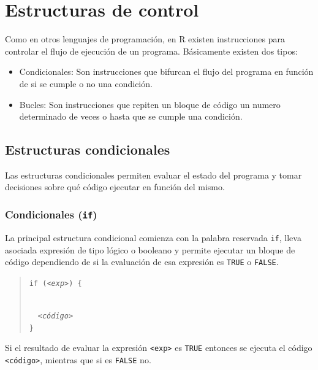\documentclass[
  spanish,
  a4paper,
]{scrreport}
\providecommand{\tightlist}{%
  \setlength{\itemsep}{0pt}\setlength{\parskip}{0pt}}
\theoremstyle{definition}
\theoremstyle{definition}
\theoremstyle{remark}
\begin{document}

\chapter{Estructuras de control}\label{estructuras-de-control}

Como en otros lenguajes de programación, en R existen instrucciones para
controlar el flujo de ejecución de un programa. Básicamente existen dos
tipos:

\begin{itemize}
\tightlist
\item
  Condicionales: Son instrucciones que bifurcan el flujo del programa en
  función de si se cumple o no una condición.
\item
  Bucles: Son instrucciones que repiten un bloque de código un numero
  determinado de veces o hasta que se cumple una condición.
\end{itemize}

\section{Estructuras condicionales}\label{estructuras-condicionales}

Las estructuras condicionales permiten evaluar el estado del programa y
tomar decisiones sobre qué código ejecutar en función del mismo.

\subsection{\texorpdfstring{Condicionales
(\texttt{if})}{Condicionales (if)}}\label{condicionales-if}

La principal estructura condicional comienza con la palabra reservada
\texttt{if}, lleva asociada expresión de tipo lógico o booleano y
permite ejecutar un bloque de código dependiendo de si la evaluación de
esa expresión es \texttt{TRUE} o \texttt{FALSE}.

\begin{quote}
\texttt{if\ (}\emph{\texttt{\textless{}exp\textgreater{}}}\texttt{)\ \{}\strut \\
  \emph{\texttt{\textless{}código\textgreater{}}}\\
\texttt{\}}
\end{quote}

Si el resultado de evaluar la expresión
\texttt{\textless{}exp\textgreater{}} es \texttt{TRUE} entonces se
ejecuta el código \texttt{\textless{}código\textgreater{}}, mientras que
si es \texttt{FALSE} no.
\end{document}
